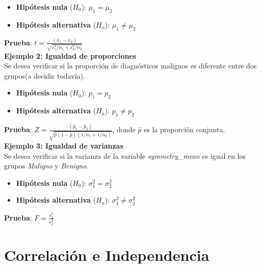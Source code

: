\documentclass[a4paper, 12pt]{article}
\begin{document}
\begin{itemize}
	\item \textbf{Hipótesis nula} (\(H_0\)): \(\mu_1 = \mu_2\)
	\item \textbf{Hipótesis alternativa} (\(H_a\)): \(\mu_1 \neq \mu_2\)
\end{itemize}

\textbf{Prueba}: \(t = \frac{(\bar{x}_1 - \bar{x}_2)}{\sqrt{s_1^2/n_1 + s_2^2/n_2}}\)\\

\textbf{Ejemplo 2: Igualdad de proporciones}\\

Se desea verificar si la proporción de diagnósticos malignos es diferente entre dos grupos(a decidir todavía).

\begin{itemize}
	\item \textbf{Hipótesis nula} (\(H_0\)): \(p_1 = p_2\)
	\item \textbf{Hipótesis alternativa} (\(H_a\)): \(p_1 \neq p_2\)
\end{itemize}

\textbf{Prueba}: \(Z = \frac{(\hat{p}_1 - \hat{p}_2)}{\sqrt{\hat{p}(1-\hat{p})(1/n_1 + 1/n_2)}}\), donde \(\hat{p}\) es la proporción conjunta.\\

\textbf{Ejemplo 3: Igualdad de varianzas}\\

Se desea verificar si la varianza de la variable \textit{symmetry\_mean} es igual en los grupos \textit{Maligno} y \textit{Benigno}.

\begin{itemize}
	\item \textbf{Hipótesis nula} (\(H_0\)): \(\sigma_1^2 = \sigma_2^2\)
	\item \textbf{Hipótesis alternativa} (\(H_a\)): \(\sigma_1^2 \neq \sigma_2^2\)
\end{itemize}

\textbf{Prueba}: \(F = \frac{s_1^2}{s_2^2}\)


\newpage

\section{Correlación e Independencia}
\end{document}
